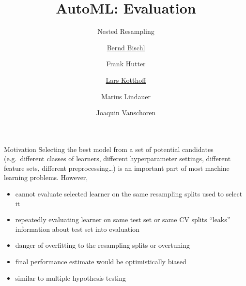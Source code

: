 




\title[AutoML: Risks]{AutoML: Evaluation} %
\subtitle{Nested Resampling} %
\author[Lars Kotthoff]{\underline{Bernd Bischl} \and Frank Hutter \and \underline{Lars Kotthoff}\newline \and Marius Lindauer \and Joaquin Vanschoren}
\institute{}
\date{}

\newcommand\reffootnote[1]{%
    \begingroup
    \renewcommand\thefootnote{}\footnote{
        \tiny #1
    \vspace*{1em}}%
    \addtocounter{footnote}{-1}%
    \endgroup
}



	
	\maketitle

    \begin{frame}[c]{Motivation}
    Selecting the best model from a set of potential candidates (e.g.\ different
    classes of learners, different hyperparameter settings, different feature
    sets, different preprocessing\ldots) is an important part of most  machine
    learning problems. However,

    \begin{itemize}
        \item cannot evaluate selected learner on the same
            resampling splits used to select it
        \item repeatedly evaluating learner on same test set or same CV splits
            ``leaks'' information about test set into evaluation
        \item danger of overfitting to the resampling splits or overtuning
        \item final performance estimate would be optimistically biased
        \item similar to multiple hypothesis testing
    \end{itemize}
    \end{frame}

